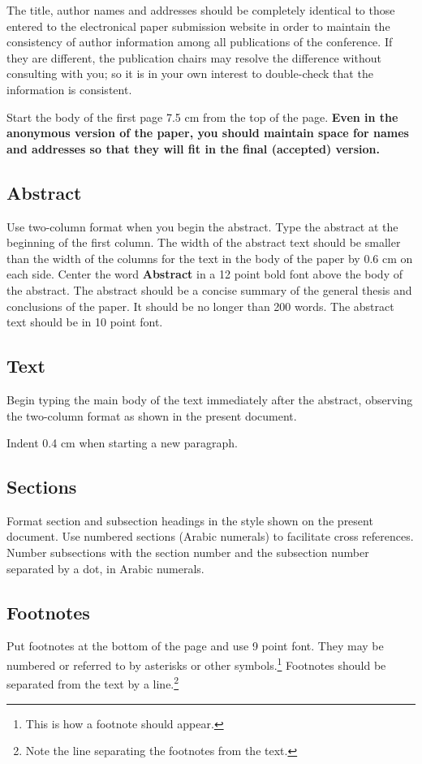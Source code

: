 \documentclass[11pt,a4paper]{article}
\begin{document}
The title, author names and addresses should be completely identical to those entered to the electronical paper submission website in order to maintain the consistency of author information among all publications of the conference.
If they are different, the publication chairs may resolve the difference without consulting with you; so it is in your own interest to double-check that the information is consistent.

Start the body of the first page 7.5 cm from the top of the page.
\textbf{Even in the anonymous version of the paper, you should maintain space for names and addresses so that they will fit in the final (accepted) version.}


\subsection{Abstract}
Use two-column format when you begin the abstract.
Type the abstract at the beginning of the first column.
The width of the abstract text should be smaller than the
width of the columns for the text in the body of the paper by 0.6 cm on each side.
Center the word \textbf{Abstract} in a 12 point bold font above the body of the abstract.
The abstract should be a concise summary of the general thesis and conclusions of the paper.
It should be no longer than 200 words.
The abstract text should be in 10 point font.

\subsection{Text}
Begin typing the main body of the text immediately after the abstract, observing the two-column format as shown in the present document.

Indent 0.4 cm when starting a new paragraph.

\subsection{Sections}

Format section and subsection headings in the style shown on the present document.
Use numbered sections (Arabic numerals) to facilitate cross references.
Number subsections with the section number and the subsection number separated by a dot, in Arabic numerals.

\subsection{Footnotes}
Put footnotes at the bottom of the page and use 9 point font.
They may be numbered or referred to by asterisks or other symbols.\footnote{This is how a footnote should appear.}
Footnotes should be separated from the text by a line.\footnote{Note the line separating the footnotes from the text.}
\end{document}
